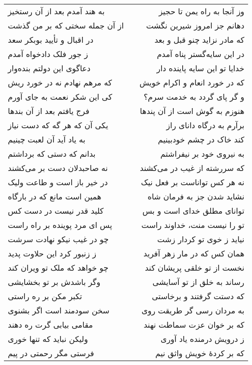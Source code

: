 \begin{center}
\begin{longtable}{l p{0.5cm} r}
به هند آمدم بعد از آن رستخیز
&&
وز آنجا به راه یمن تا حجیز
\\
از آن جمله سختی که بر من گذشت
&&
دهانم جز امروز شیرین نگشت
\\
در اقبال و تأیید بوبکر سعد
&&
که مادر نزاید چنو قبل و بعد
\\
ز جور فلک دادخواه آمدم
&&
در این سایه‌گستر پناه آمدم
\\
دعاگوی این دولتم بنده‌وار
&&
خدایا تو این سایه پاینده دار
\\
که مرهم نهادم نه در خورد ریش
&&
که در خورد انعام و اکرام خویش
\\
کی این شکر نعمت به جای آورم
&&
و گر پای گردد به خدمت سرم؟
\\
فرج یافتم بعد از آن بندها
&&
هنوزم به گوش است از آن پندها
\\
یکی آن که هر گه که دست نیاز
&&
برآرم به درگاه دانای راز
\\
به یاد آید آن لعبت چینیم
&&
کند خاک در چشم خودبینیم
\\
بدانم که دستی که برداشتم
&&
به نیروی خود بر نیفراشتم
\\
نه صاحبدلان دست بر می‌کشند
&&
که سررشته از غیب در می‌کشند
\\
در خیر باز است و طاعت ولیک
&&
نه هر کس تواناست بر فعل نیک
\\
همین است مانع که در بارگاه
&&
نشاید شدن جز به فرمان شاه
\\
کلید قدر نیست در دست کس
&&
توانای مطلق خدای است و بس
\\
پس ای مرد پوینده بر راه راست
&&
تو را نیست منت، خداوند راست
\\
چو در غیب نیکو نهادت سرشت
&&
نیاید ز خوی تو کردار زشت
\\
ز زنبور کرد این حلاوت پدید
&&
همان کس که در مار زهر آفرید
\\
چو خواهد که ملک تو ویران کند
&&
نخست از تو خلقی پریشان کند
\\
وگر باشدش بر تو بخشایشی
&&
رساند به خلق از تو آسایشی
\\
تکبر مکن بر ره راستی
&&
که دستت گرفتند و برخاستی
\\
سخن سودمند است اگر بشنوی
&&
به مردان رسی گر طریقت روی
\\
مقامی بیابی گرت ره دهند
&&
که بر خوان عزت سماطت نهند
\\
ولیکن نباید که تنها خوری
&&
ز درویش درمنده یاد آوری
\\
فرستی مگر رحمتی در پیم
&&
که بر کردهٔ خویش واثق نیم
\\
\end{longtable}
\end{center}
